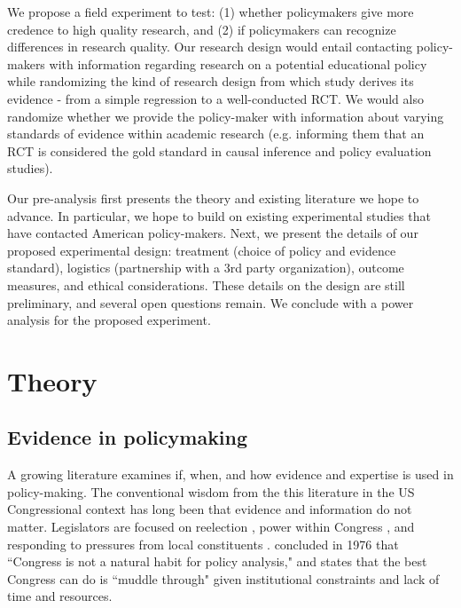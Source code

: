 \documentclass[12pt,final,fleqn]{article}
\theoremstyle{plain}
\begin{document}
We propose a field experiment to test: (1) whether policymakers give more credence to high quality research, and (2) if policymakers can recognize differences in research quality. Our research design would entail contacting policy-makers with information regarding research on a potential educational policy while randomizing the kind of research design from which study derives its evidence - from a simple regression to a well-conducted RCT. We would also randomize whether we provide the policy-maker with information about varying standards of evidence within academic research (e.g. informing them that an RCT is considered the gold standard in causal inference and policy evaluation studies). 

Our pre-analysis first presents the theory and existing literature we hope to advance. In particular, we hope to build on existing experimental studies that have contacted American policy-makers. Next, we present the details of our proposed experimental design: treatment (choice of policy and evidence standard), logistics (partnership with a 3rd party organization), outcome measures, and ethical considerations. These details on the design are still preliminary, and several open questions remain. We conclude with a power analysis for the proposed experiment.


\section{Theory} \label{sec:Theory}
\subsection{Evidence in policymaking}  \label{sec: evidence}

A growing literature examines if, when, and how evidence and expertise is used in policy-making. The conventional wisdom from the this literature in the US Congressional context has long been that evidence and information do not matter. Legislators are focused on reelection \citep{mayhew1974congress}, power within Congress \citep{fenno1973congressmen}, and responding to pressures from local constituents \citep{fenno2002home}. \citet{schick1976supply} concluded in 1976 that ``Congress is not a natural habit for policy analysis," and \citet{lindblom2018science} states that the best Congress can do is ``muddle through" given institutional constraints and lack of time and resources. 
\end{document}
